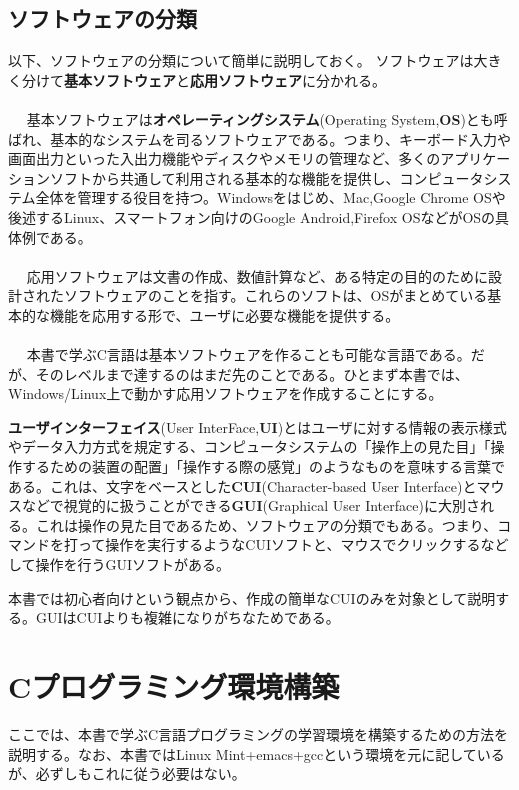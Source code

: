 \subsection{ソフトウェアの分類}
以下、ソフトウェアの分類について簡単に説明しておく。
ソフトウェアは大きく分けて\textbf{基本ソフトウェア}と\textbf{応用ソフトウェア}に分かれる。
\\ \\　
基本ソフトウェアは\textbf{オペレーティングシステム}(Operating System,\textbf{OS})とも呼ばれ、基本的なシステムを司るソフトウェアである。つまり、キーボード入力や画面出力といった入出力機能やディスクやメモリの管理など、多くのアプリケーションソフトから共通して利用される基本的な機能を提供し、コンピュータシステム全体を管理する役目を持つ。Windowsをはじめ、Mac,Google Chrome OSや後述するLinux、スマートフォン向けのGoogle Android,Firefox OSなどがOSの具体例である。
\\ \\　
応用ソフトウェアは文書の作成、数値計算など、ある特定の目的のために設計されたソフトウェアのことを指す。これらのソフトは、OSがまとめている基本的な機能を応用する形で、ユーザに必要な機能を提供する。
\\ \\　
本書で学ぶC言語は基本ソフトウェアを作ることも可能な言語である。だが、そのレベルまで達するのはまだ先のことである。ひとまず本書では、Windows/Linux上で動かす応用ソフトウェアを作成することにする。

\textbf{ユーザインターフェイス}(User InterFace,\textbf{UI})とはユーザに対する情報の表示様式やデータ入力方式を規定する、コンピュータシステムの「操作上の見た目」「操作するための装置の配置」「操作する際の感覚」のようなものを意味する言葉である。これは、文字をベースとした\textbf{CUI}(Character-based User Interface)とマウスなどで視覚的に扱うことができる\textbf{GUI}(Graphical User Interface)に大別される。これは操作の見た目であるため、ソフトウェアの分類でもある。つまり、コマンドを打って操作を実行するようなCUIソフトと、マウスでクリックするなどして操作を行うGUIソフトがある。

本書では初心者向けという観点から、作成の簡単なCUIのみを対象として説明する。GUIはCUIよりも複雑になりがちなためである。

\section{Cプログラミング環境構築}
ここでは、本書で学ぶC言語プログラミングの学習環境を構築するための方法を説明する。なお、本書ではLinux Mint+emacs+gccという環境を元に記しているが、必ずしもこれに従う必要はない。

